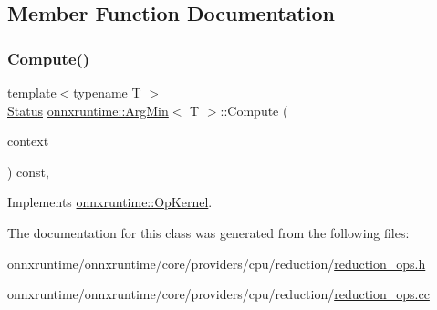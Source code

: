 \subsection{Member Function Documentation}
\mbox{\label{classonnxruntime_1_1ArgMin_a92caea3a1bb71eab40e4d8d8dade5d84}} 
\subsubsection{\texorpdfstring{Compute()}{Compute()}}
{\footnotesize\ttfamily template$<$typename T $>$ \\
\mbox{\hyperlink{classonnxruntime_1_1common_1_1Status}{Status}} \mbox{\hyperlink{classonnxruntime_1_1ArgMin}{onnxruntime\+::\+Arg\+Min}}$<$ T $>$\+::Compute (\begin{DoxyParamCaption}\item[{\mbox{\hyperlink{classonnxruntime_1_1OpKernelContext}{Op\+Kernel\+Context}} $\ast$}]{context }\end{DoxyParamCaption}) const\hspace{0.3cm}{\ttfamily [override]}, {\ttfamily [virtual]}}



Implements \mbox{\hyperlink{classonnxruntime_1_1OpKernel_a9eca8656a78b1b3ab9d3351a12798650}{onnxruntime\+::\+Op\+Kernel}}.



The documentation for this class was generated from the following files\+:\begin{DoxyCompactItemize}
\item 
onnxruntime/onnxruntime/core/providers/cpu/reduction/\mbox{\hyperlink{cpu_2reduction_2reduction__ops_8h}{reduction\+\_\+ops.\+h}}\item 
onnxruntime/onnxruntime/core/providers/cpu/reduction/\mbox{\hyperlink{cpu_2reduction_2reduction__ops_8cc}{reduction\+\_\+ops.\+cc}}\end{DoxyCompactItemize}
